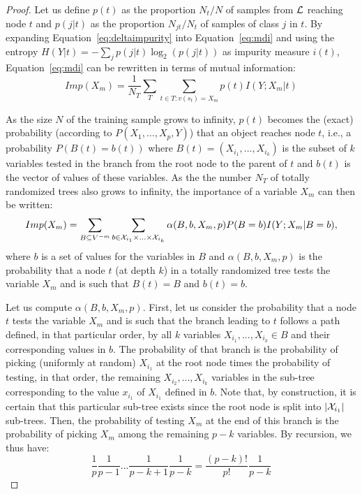 \documentclass{article}
\begin{document}
\begin{proof}
Let us define $p(t)$ as the proportion $N_t / N$ of samples from ${\cal L}$
reaching node $t$ and $p(j|t)$ as the proportion $N_{jt} / N_t$ of samples
of class $j$ in $t$. By expanding Equation~\ref{eq:deltaimpurity} into
Equation~\ref{eq:mdi} and using the entropy $H(Y|t) = -\sum_j p(j|t) \log_2(p(j|t))$
as impurity measure $i(t)$, Equation~\ref{eq:mdi} can be rewritten in terms of
mutual information:
\begin{equation*}
Imp(X_m) = \frac{1}{N_T} \sum_{T} \sum_{t \in T:v(s_t) = X_m} p(t) I(Y;X_m|t)
\end{equation*}

As the size $N$ of the training sample grows to infinity,
$p(t)$ becomes the (exact) probability (according to $P(X_1,\ldots,X_p,Y)$) that
an object reaches node $t$, i.e., a probability $P(B(t)=b(t))$ where $B(t)=(X_{i_1}, ..., X_{i_{k}})$ is
the subset of $k$ variables tested in the branch from the root node to the parent of $t$ and
$b(t)$ is the vector of values of these variables. As the the number $N_T$ of
totally randomized trees also grows to infinity, the importance of a variable
$X_m$ can then be written:
\begin{equation*}
Imp(X_m)=\sum_{B\subseteq V^{-m}} \sum_{b\in {\cal X}_{i_1}\times ... \times {\cal X}_{i_{k}} } \alpha(B,b,X_m,p) P(B=b) I(Y;X_m|B=b),
\end{equation*}
where $b$ is a set of values for the variables in $B$ and $\alpha(B,b,X_m,p)$ is
the probability that a node $t$ (at depth $k$) in a totally randomized tree
tests the variable $X_m$ and is such that $B(t)=B$ and $b(t)=b$.

Let us compute $\alpha(B,b,X_m,p)$. First, let us consider the probability that
a node $t$ tests the variable $X_m$ and is such that the branch leading to $t$
follows a path defined, in that particular order, by all $k$ variables $X_{i_1},
..., X_{i_{k}} \in B$ and their corresponding values in $b$. The probability of
that branch is the probability of picking (uniformly at random)  $X_{i_1}$  at
the root node times the probability of testing, in that order, the remaining
$X_{i_2}, ..., X_{i_{k}}$ variables in the sub-tree corresponding to the value
$x_{i_1}$ of $X_{i_1}$ defined in $b$. Note that, by construction, it is certain
that this particular sub-tree exists since the root node is split into $|{\cal
X}_{i_1}|$ sub-trees.  Then, the
probability of testing $X_m$ at the end of this branch is the probability of
picking $X_m$ among the remaining $p-k$ variables. By recursion, we thus have:
$$\frac{1}{p} \frac{1}{p-1} ... \frac{1}{p-k+1} \frac{1}{p-k} =
\frac{(p-k)!}{p!} \frac{1}{p-k}$$


\end{proof}
\end{document}
